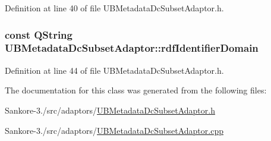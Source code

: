 Definition at line 40 of file U\-B\-Metadata\-Dc\-Subset\-Adaptor.\-h.

\hypertarget{class_u_b_metadata_dc_subset_adaptor_ad8bf279465b83a882ec8f41421f8f69b}{
\subsubsection[{rdf\-Identifier\-Domain}]{\setlength{\rightskip}{0pt plus 5cm}const Q\-String U\-B\-Metadata\-Dc\-Subset\-Adaptor\-::rdf\-Identifier\-Domain\hspace{0.3cm}{\ttfamily [static]}}}\label{dc/d51/class_u_b_metadata_dc_subset_adaptor_ad8bf279465b83a882ec8f41421f8f69b}


Definition at line 44 of file U\-B\-Metadata\-Dc\-Subset\-Adaptor.\-h.



The documentation for this class was generated from the following files\-:\begin{DoxyCompactItemize}
\item 
Sankore-\/3./src/adaptors/\hyperlink{_u_b_metadata_dc_subset_adaptor_8h}{U\-B\-Metadata\-Dc\-Subset\-Adaptor.\-h}\item 
Sankore-\/3./src/adaptors/\hyperlink{_u_b_metadata_dc_subset_adaptor_8cpp}{U\-B\-Metadata\-Dc\-Subset\-Adaptor.\-cpp}\end{DoxyCompactItemize}
